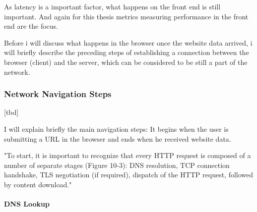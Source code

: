 
As latency is a important factor, what happens on the front end is still important.
And again for this thesis metrics measuring performance in the front end are the focus.

Before i will discuss what happens in the browser once the website data arrived, i will briefly describe the preceding steps of establishing a connection between the browser (client) and the server, which can be considered to be still a part of the network.









\subsubsection{Network Navigation Steps}

[tbd]

I will explain briefly the main navigation steps: It begins when the user is submitting a URL in the browser and ends when he received website data.

"To start, it is important to recognize that every HTTP request is composed of a number of separate stages (Figure 10-3): DNS resolution, TCP connection handshake, TLS negotiation (if required), dispatch of the HTTP request, followed by content download." %







\paragraph{DNS Lookup}

